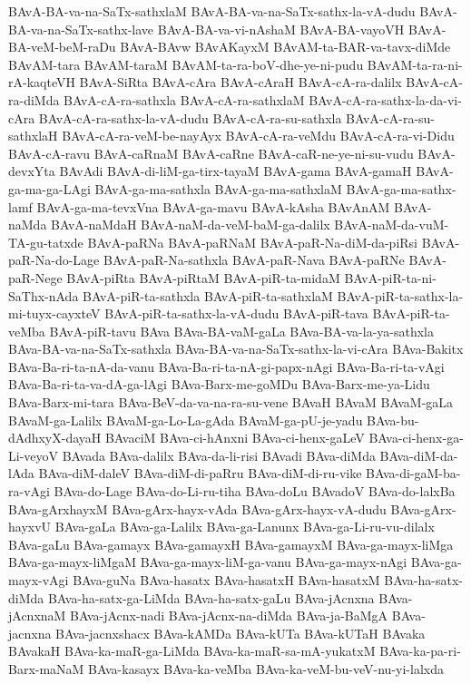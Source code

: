 {BAvA-BA-va-na-SaTx-sathxlaM
BAvA-BA-va-na-SaTx-sathx-la-vA-dudu
BAvA-BA-va-na-SaTx-sathx-lave
BAvA-BA-va-vi-nAshaM
BAvA-BA-vayoVH
BAvA-BA-veM-beM-raDu
BAvA-BAvw
BAvAKayxM
BAvAM-ta-BAR-va-tavx-diMde
BAvAM-tara
BAvAM-taraM
BAvAM-ta-ra-boV-dhe-ye-ni-pudu
BAvAM-ta-ra-ni-rA-kaqteVH
BAvA-SiRta
BAvA-cAra
BAvA-cAraH
BAvA-cA-ra-dalilx
BAvA-cA-ra-diMda
BAvA-cA-ra-sathxla
BAvA-cA-ra-sathxlaM
BAvA-cA-ra-sathx-la-da-vi-cAra
BAvA-cA-ra-sathx-la-vA-dudu
BAvA-cA-ra-su-sathxla
BAvA-cA-ra-su-sathxlaH
BAvA-cA-ra-veM-be-nayAyx
BAvA-cA-ra-veMdu
BAvA-cA-ra-vi-Didu
BAvA-cA-ravu
BAvA-caRnaM
BAvA-caRne
BAvA-caR-ne-ye-ni-su-vudu
BAvA-devxYta
BAvAdi
BAvA-di-liM-ga-tirx-tayaM
BAvA-gama
BAvA-gamaH
BAvA-ga-ma-ga-LAgi
BAvA-ga-ma-sathxla
BAvA-ga-ma-sathxlaM
BAvA-ga-ma-sathx-lamf
BAvA-ga-ma-tevxVna
BAvA-ga-mavu
BAvA-kAsha
BAvAnAM
BAvA-naMda
BAvA-naMdaH
BAvA-naM-da-veM-baM-ga-dalilx
BAvA-naM-da-vuM-TA-gu-tatxde
BAvA-paRNa
BAvA-paRNaM
BAvA-paR-Na-diM-da-piRsi
BAvA-paR-Na-do-Lage
BAvA-paR-Na-sathxla
BAvA-paR-Nava
BAvA-paRNe
BAvA-paR-Nege
BAvA-piRta
BAvA-piRtaM
BAvA-piR-ta-midaM
BAvA-piR-ta-ni-SaThx-nAda
BAvA-piR-ta-sathxla
BAvA-piR-ta-sathxlaM
BAvA-piR-ta-sathx-la-mi-tuyx-cayxteV
BAvA-piR-ta-sathx-la-vA-dudu
BAvA-piR-tava
BAvA-piR-ta-veMba
BAvA-piR-tavu
BAva
BAva-BA-vaM-gaLa
BAva-BA-va-la-ya-sathxla
BAva-BA-va-na-SaTx-sathxla
BAva-BA-va-na-SaTx-sathx-la-vi-cAra
BAva-Bakitx
BAva-Ba-ri-ta-nA-da-vanu
BAva-Ba-ri-ta-nA-gi-papx-nAgi
BAva-Ba-ri-ta-vAgi
BAva-Ba-ri-ta-va-dA-ga-lAgi
BAva-Barx-me-goMDu
BAva-Barx-me-ya-Lidu
BAva-Barx-mi-tara
BAva-BeV-da-va-na-ra-su-vene
BAvaH
BAvaM
BAvaM-gaLa
BAvaM-ga-Lalilx
BAvaM-ga-Lo-La-gAda
BAvaM-ga-pU-je-yadu
BAva-bu-dAdhxyX-dayaH
BAvaciM
BAva-ci-hAnxni
BAva-ci-henx-gaLeV
BAva-ci-henx-ga-Li-veyoV
BAvada
BAva-dalilx
BAva-da-li-risi
BAvadi
BAva-diMda
BAva-diM-da-lAda
BAva-diM-daleV
BAva-diM-di-paRru
BAva-diM-di-ru-vike
BAva-di-gaM-ba-ra-vAgi
BAva-do-Lage
BAva-do-Li-ru-tiha
BAva-doLu
BAvadoV
BAva-do-lalxBa
BAva-gArxhayxM
BAva-gArx-hayx-vAda
BAva-gArx-hayx-vA-dudu
BAva-gArx-hayxvU
BAva-gaLa
BAva-ga-Lalilx
BAva-ga-Lanunx
BAva-ga-Li-ru-vu-dilalx
BAva-gaLu
BAva-gamayx
BAva-gamayxH
BAva-gamayxM
BAva-ga-mayx-liMga
BAva-ga-mayx-liMgaM
BAva-ga-mayx-liM-ga-vanu
BAva-ga-mayx-nAgi
BAva-ga-mayx-vAgi
BAva-guNa
BAva-hasatx
BAva-hasatxH
BAva-hasatxM
BAva-ha-satx-diMda
BAva-ha-satx-ga-LiMda
BAva-ha-satx-gaLu
BAva-jAcnxna
BAva-jAcnxnaM
BAva-jAcnx-nadi
BAva-jAcnx-na-diMda
BAva-ja-BaMgA
BAva-jacnxna
BAva-jacnxshacx
BAva-kAMDa
BAva-kUTa
BAva-kUTaH
BAvaka
BAvakaH
BAva-ka-maR-ga-LiMda
BAva-ka-maR-sa-mA-yukatxM
BAva-ka-pa-ri-Barx-maNaM
BAva-kasayx
BAva-ka-veMba
BAva-ka-veM-bu-veV-nu-yi-lalxda
}
